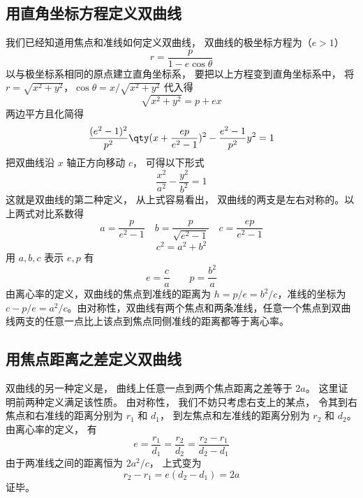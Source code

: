 


\subsection{用直角坐标方程定义双曲线}
我们已经知道用焦点和准线如何定义双曲线， 双曲线的极坐标方程为（$e>1$）
\begin{equation}
r = \frac{p}{1 - e\cos \theta }
\end{equation}
以与极坐标系相同的原点建立直角坐标系， 要把以上方程变到直角坐标系中， 将$r = \sqrt{x^2 + y^2}$，$\cos \theta  = x/\sqrt{x^2 + y^2}$ 代入得
\begin{equation}
\sqrt{x^2 + y^2}  = p + ex
\end{equation}
两边平方且化简得
\begin{equation}
\frac{(e^2 - 1)^2}{p^2} \qty(x + \frac{ep}{e^2 - 1} )^2 - \frac{e^2 - 1}{p^2} y^2 = 1
\end{equation}
把双曲线沿 $x$ 轴正方向移动 $c$， 可得以下形式
\begin{equation}\label{eq_Hypb3_4}
\frac{x^2}{a^2} - \frac{y^2}{b^2} = 1
\end{equation}
这就是双曲线的第二种定义， 从上式容易看出， 双曲线的两支是左右对称的。以上两式对比系数得
\begin{equation}
a = \frac{p}{e^2 - 1} \quad  b = \frac{p}{\sqrt{e^2 - 1} } \quad c = \frac{ep}{e^2 - 1}
\end{equation}
\begin{equation}
c^2 = a^2 + b^2
\end{equation}
用 $a, b, c$ 表示 $e,p$ 有
\begin{equation}
e = \frac{c}{a} \qquad p = \frac{b^2}{a}
\end{equation}
由离心率的定义，双曲线的焦点到准线的距离为 $h = p/e=b^2/c$，准线的坐标为 $c-p/e = a^2/c$。由对称性，双曲线有两个焦点和两条准线，任意一个焦点到双曲线两支的任意一点比上该点到焦点同侧准线的距离都等于离心率。

\subsection{用焦点距离之差定义双曲线}
双曲线的另一种定义是， 曲线上任意一点到两个焦点距离之差等于 $2a$。 这里证明前两种定义满足该性质。 由对称性， 我们不妨只考虑右支上的某点， 令其到右焦点和右准线的距离分别为 $r_1$ 和 $d_1$， 到左焦点和左准线的距离分别为 $r_2$ 和 $d_2$。 由离心率的定义， 有
\begin{equation}
e = \frac{r_1}{d_1} = \frac{r_2}{d_2} = \frac{r_2 - r_1}{d_2 - d_1}
\end{equation}
由于两准线之间的距离恒为 $2a^2/c$， 上式变为
\begin{equation}
r_2 - r_1 = e(d_2 - d_1) = 2a
\end{equation}
证毕。

